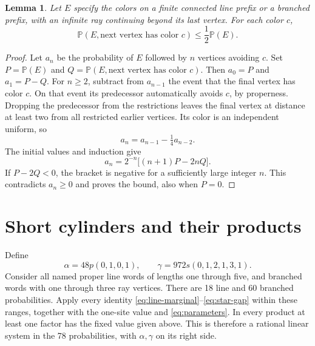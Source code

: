 \documentclass[11pt]{article}
\newtheorem{lemma}[theorem]{Lemma}
\newcommand{\Prob}{\mathbb P}
\begin{document}
\begin{lemma}\label{lem:tail}
Let $E$ specify the colors on a finite connected line prefix or a branched
prefix, with an infinite ray continuing beyond its last vertex. For each
color $c$,
\begin{equation}\label{eq:half}
\Prob(E,\text{next vertex has color }c)\leq\frac12\Prob(E).
\end{equation}
\end{lemma}
\begin{proof}
Let $a_n$ be the probability of $E$ followed by $n$ vertices avoiding $c$.
Set $P=\Prob(E)$ and $Q=\Prob(E,\text{next vertex has color }c)$. Then
$a_0=P$ and $a_1=P-Q$. For $n\geq2$, subtract from $a_{n-1}$ the event that
the final vertex has color $c$. On that event its predecessor automatically
avoids $c$, by properness. Dropping the predecessor from the restrictions
leaves the final vertex at distance at least two from all restricted earlier
vertices. Its color is an independent uniform, so
\[
a_n=a_{n-1}-\tfrac14a_{n-2}.
\]
The initial values and induction give
\[
a_n=2^{-n}\bigl[(n+1)P-2nQ\bigr].
\]
If $P-2Q<0$, the bracket is negative for a sufficiently large integer $n$.
This contradicts $a_n\geq0$ and proves the bound, also when $P=0$.
\end{proof}

\section{Short cylinders and their products}\label{sec:products}
Define
\begin{equation}\label{eq:parameters}
\alpha=48p(0,1,0,1),\qquad
\gamma=972s(0,1,2,1,3,1).
\end{equation}
Consider all named proper line words of lengths one through five, and
branched words with one through three ray vertices. There are 18 line and
60 branched probabilities. Apply every identity
\eqref{eq:line-marginal}--\eqref{eq:star-gap} within these ranges, together
with the one-site value and \eqref{eq:parameters}. In every product at least
one factor has the fixed value given above. This is therefore a rational
linear system in the 78 probabilities, with $\alpha,\gamma$ on its right side.
\end{document}
